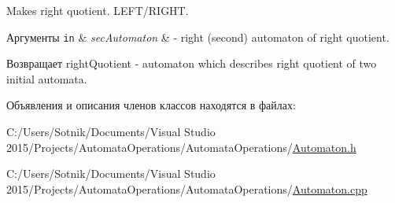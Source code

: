 Makes right quotient. L\+E\+F\+T/\+R\+I\+G\+HT. 


\begin{DoxyParams}[1]{Аргументы}
\mbox{\tt in}  & {\em sec\+Automaton} & -\/ right (second) automaton of right quotient. \\
\hline
\end{DoxyParams}
\begin{DoxyReturn}{Возвращает}
right\+Quotient -\/ automaton which describes right quotient of two initial automata. 
\end{DoxyReturn}


Объявления и описания членов классов находятся в файлах\+:\begin{DoxyCompactItemize}
\item 
C\+:/\+Users/\+Sotnik/\+Documents/\+Visual Studio 2015/\+Projects/\+Automata\+Operations/\+Automata\+Operations/\mbox{\hyperlink{_automaton_8h}{Automaton.\+h}}\item 
C\+:/\+Users/\+Sotnik/\+Documents/\+Visual Studio 2015/\+Projects/\+Automata\+Operations/\+Automata\+Operations/\mbox{\hyperlink{_automaton_8cpp}{Automaton.\+cpp}}\end{DoxyCompactItemize}
